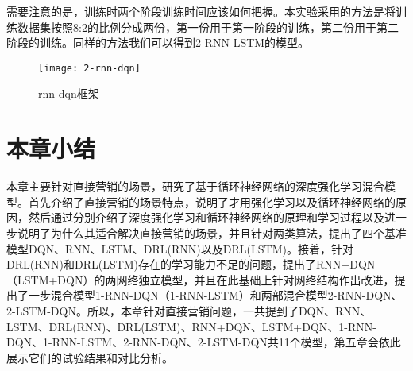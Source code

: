 需要注意的是，训练时两个阶段训练时间应该如何把握。本实验采用的方法是将训练数据集按照8:2的比例分成两份，第一份用于第一阶段的训练，第二份用于第二阶段的训练。同样的方法我们可以得到2-RNN-LSTM的模型。

\begin{figure}[htbp]
\centering
\texttt{[image: 2-rnn-dqn]}
\caption{rnn-dqn框架}
\label{fig:2-rnn-dqn}
\end{figure}






\section{本章小结}
本章主要针对直接营销的场景，研究了基于循环神经网络的深度强化学习混合模型。首先介绍了直接营销的场景特点，说明了才用强化学习以及循环神经网络的原因，然后通过分别介绍了深度强化学习和循环神经网络的原理和学习过程以及进一步说明了为什么其适合解决直接营销的场景，并且针对两类算法，提出了四个基准模型DQN、RNN、LSTM、DRL(RNN)以及DRL(LSTM)。接着，针对DRL(RNN)和DRL(LSTM)存在的学习能力不足的问题，提出了RNN+DQN（LSTM+DQN）的两网络独立模型，并且在此基础上针对网络结构作出改进，提出了一步混合模型1-RNN-DQN（1-RNN-LSTM）和两部混合模型2-RNN-DQN、2-LSTM-DQN。所以，本章针对直接营销问题，一共提到了DQN、RNN、LSTM、DRL(RNN)、DRL(LSTM)、RNN+DQN、LSTM+DQN、1-RNN-DQN、1-RNN-LSTM、2-RNN-DQN、2-LSTM-DQN共11个模型，第五章会依此展示它们的试验结果和对比分析。